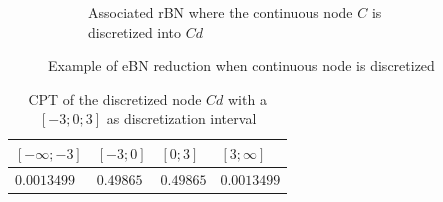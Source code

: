 \begin{figure}[h]
\begin{subfigure}{0.45\textwidth}
        \caption{Associated rBN where the continuous node $C$ is discretized into $Cd$}\label{1_rbn_disc_example}
    \end{subfigure}
    \caption{Example of eBN reduction when continuous node is discretized}\label{1_reduction_disc}
\end{figure}

\begin{table}[hbt!]
    \begin{center}
        \caption{CPT of the discretized node $Cd$ with a $[-3;0;3]$ as discretization interval}\label{exact_disc_tab}
        \begin{tabular}{P{1.5cm}P{1.5cm}P{1.5cm}P{1.5cm}}
            \textbf{$[-\infty;-3]$} & \textbf{$[-3;0]$} & \textbf{$[0;3]$} & \textbf{$[3;\infty]$} \\
            \midrule
            $0.0013499$ & $ 0.49865$ & $ 0.49865$ & $0.0013499$ \\
        \end{tabular}
    \end{center}
\end{table}

